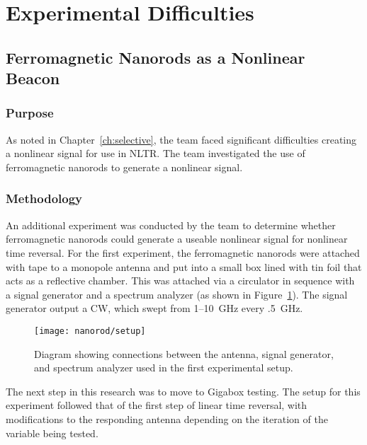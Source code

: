 \section{Experimental Difficulties}
\label{sec:nltr-expr-diff}

\subsection{Ferromagnetic Nanorods as a Nonlinear Beacon}
\label{sec:nltr-nanorod}

\subsubsection{Purpose}

As noted in Chapter~\ref{ch:selective}, the team faced significant difficulties creating a nonlinear signal for use in NLTR.  The team investigated the use of ferromagnetic nanorods to generate a nonlinear signal.

\subsubsection{Methodology}

An additional experiment was conducted by the team to determine whether ferromagnetic nanorods could generate a useable nonlinear signal for nonlinear time reversal. For the first experiment, the ferromagnetic nanorods were attached with tape to a monopole antenna and put into a small box lined with tin foil that acts as a reflective chamber. This was attached via a circulator in sequence with a signal generator and a spectrum analyzer (as shown in Figure~\ref{fig:nanorod-setup}). The signal generator output a CW, which swept from \numrange{1}{10}~GHz every .5~GHz.

\begin{figure}[h!]
\centering
\texttt{[image: nanorod/setup]}
    \caption[Initial ferromagnetic nanorod experimental setup]{Diagram showing connections between the antenna, signal generator, and spectrum analyzer used in the first experimental setup.}
    \label{fig:nanorod-setup}
\end{figure}

The next step in this research was to move to Gigabox testing. The setup for this experiment followed that of the first step of linear time reversal, with modifications to the responding antenna depending on the iteration of the variable being tested.

